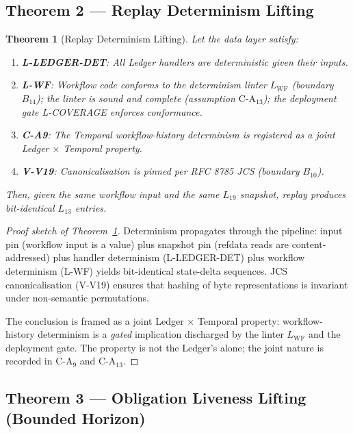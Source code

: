 \documentclass[11pt,a4paper]{article}
\newtheorem{theorem}[definition]{Theorem}
\begin{document}
\subsection{Theorem 2 --- Replay Determinism Lifting}
\label{sec:thm-replay}

\begin{theorem}[Replay Determinism Lifting]
\label{thm:replay}
Let the data layer satisfy:
\begin{enumerate}[nosep]
\item \textbf{L-LEDGER-DET}: All Ledger handlers are deterministic given their inputs.
\item \textbf{L-WF}: Workflow code conforms to the determinism linter $L_{\mathrm{WF}}$ (boundary $B_{14}$); the linter is sound and complete (assumption $\mathrm{C\textrm{-}A}_{13}$); the deployment gate L-COVERAGE enforces conformance.
\item \textbf{C-A9}: The Temporal workflow-history determinism is registered as a joint Ledger $\times$ Temporal property.
\item \textbf{V-V19}: Canonicalisation is pinned per RFC 8785 JCS (boundary $B_{10}$).
\end{enumerate}
Then, given the same workflow input and the same $L_{19}$ snapshot, replay produces bit-identical $L_{13}$ entries.
\end{theorem}

\begin{proof}[Proof sketch of Theorem~\ref{thm:replay}]
Determinism propagates through the pipeline: input pin (workflow input is a value) plus snapshot pin (refdata reads are content-addressed) plus handler determinism (L-LEDGER-DET) plus workflow determinism (L-WF) yields bit-identical state-delta sequences. JCS canonicalisation (V-V19) ensures that hashing of byte representations is invariant under non-semantic permutations.

The conclusion is framed as a joint Ledger $\times$ Temporal property: workflow-history determinism is a \emph{gated} implication discharged by the linter $L_{\mathrm{WF}}$ and the deployment gate. The property is not the Ledger's alone; the joint nature is recorded in $\mathrm{C\textrm{-}A}_9$ and $\mathrm{C\textrm{-}A}_{13}$. \qedhere
\end{proof}

\subsection{Theorem 3 --- Obligation Liveness Lifting (Bounded Horizon)}
\label{sec:thm-liveness}
\end{document}

